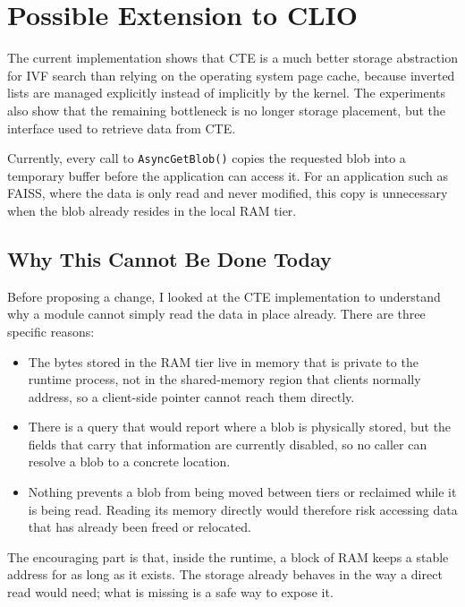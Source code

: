 \documentclass[11pt]{article}
\begin{document}
\section{Possible Extension to CLIO}

The current implementation shows that CTE is a much better storage
abstraction for IVF search than relying on the operating system page
cache, because inverted lists are managed explicitly instead of
implicitly by the kernel. The experiments also show that the remaining
bottleneck is no longer storage placement, but the interface used to
retrieve data from CTE.

Currently, every call to \texttt{AsyncGetBlob()} copies the requested
blob into a temporary buffer before the application can access it. For
an application such as FAISS, where the data is only read and never
modified, this copy is unnecessary when the blob already resides in
the local RAM tier.

\subsection{Why This Cannot Be Done Today}

Before proposing a change, I looked at the CTE implementation to
understand why a module cannot simply read the data in place already.
There are three specific reasons:

\begin{itemize}
\item The bytes stored in the RAM tier live in memory that is private
to the runtime process, not in the shared-memory region that clients
normally address, so a client-side pointer cannot reach them directly.
\item There is a query that would report where a blob is physically
stored, but the fields that carry that information are currently
disabled, so no caller can resolve a blob to a concrete location.
\item Nothing prevents a blob from being moved between tiers or
reclaimed while it is being read. Reading its memory directly would
therefore risk accessing data that has already been freed or relocated.
\end{itemize}

The encouraging part is that, inside the runtime, a block of RAM keeps
a stable address for as long as it exists. The storage already behaves
in the way a direct read would need; what is missing is a safe way to
expose it.
\end{document}
